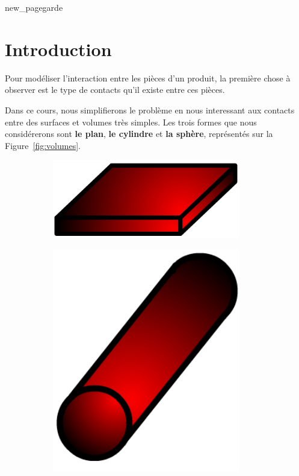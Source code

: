 \documentclass[10pt,fleqn]{article} %
\begin{document}
{new_pagegarde}
\section*{Introduction}
Pour modéliser l'interaction entre les pièces d'un produit, la première chose à observer est le type de contacts qu'il existe entre ces pièces.

Dans ce cours, nous simplifierons le problème en nous interessant aux contacts entre des surfaces et volumes très simples. Les trois formes que nous considérerons sont \textbf{le plan}, \textbf{le cylindre} et \textbf{la sphère}, représentés sur la Figure~\ref{fig:volumes}.

\begin{figure}[h]
  \centering
  \begin{subfigure}[b]{0.3\textwidth}
    \centering
    \includegraphics[width=0.9\textwidth,height=.1\textheight,keepaspectratio]{images/plan_rouge_seul}
    \caption{}
  \end{subfigure}\hfill
  \begin{subfigure}[b]{.3\textwidth}
    \centering
    \includegraphics[width=0.9\textwidth,height=.1\textheight,keepaspectratio]{images/cylindre_rouge_seul}

\end{subfigure}
\end{figure}
\end{document}
